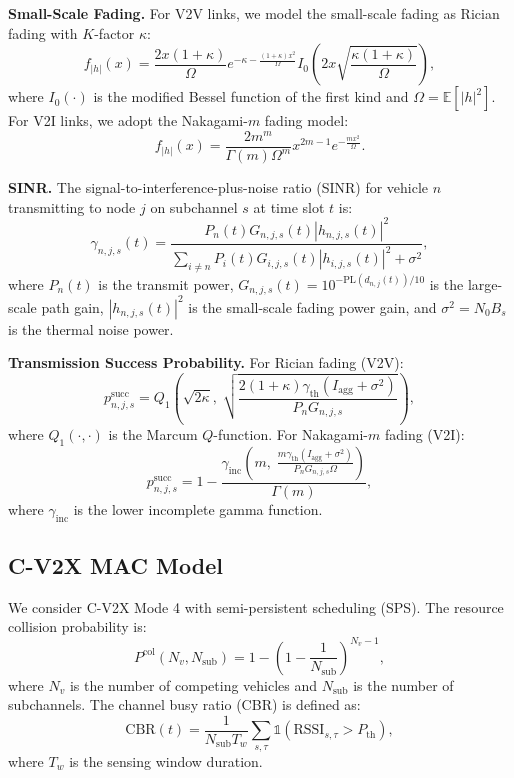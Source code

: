 \documentclass[journal]{IEEEtran}
\begin{document}
\textbf{Small-Scale Fading.} For V2V links, we model the small-scale fading as Rician fading with $K$-factor $\kappa$:
\begin{equation} \label{eq:rician}
f_{|h|}(x) = \frac{2x(1+\kappa)}{\Omega} e^{-\kappa - \frac{(1+\kappa)x^2}{\Omega}} I_0\left(2x\sqrt{\frac{\kappa(1+\kappa)}{\Omega}}\right),
\end{equation}
where $I_0(\cdot)$ is the modified Bessel function of the first kind and $\Omega = \mathbb{E}[|h|^2]$. For V2I links, we adopt the Nakagami-$m$ fading model:
\begin{equation} \label{eq:nakagami}
f_{|h|}(x) = \frac{2m^m}{\Gamma(m)\Omega^m} x^{2m-1} e^{-\frac{mx^2}{\Omega}}.
\end{equation}

\textbf{SINR.} The signal-to-interference-plus-noise ratio (SINR) for vehicle $n$ transmitting to node $j$ on subchannel $s$ at time slot $t$ is:
\begin{equation} \label{eq:sinr}
\gamma_{n,j,s}(t) = \frac{P_n(t) G_{n,j,s}(t) |h_{n,j,s}(t)|^2}{\sum_{i \neq n} P_i(t) G_{i,j,s}(t) |h_{i,j,s}(t)|^2 + \sigma^2},
\end{equation}
where $P_n(t)$ is the transmit power, $G_{n,j,s}(t) = 10^{-\text{PL}(d_{n,j}(t))/10}$ is the large-scale path gain, $|h_{n,j,s}(t)|^2$ is the small-scale fading power gain, and $\sigma^2 = N_0 B_s$ is the thermal noise power.

\textbf{Transmission Success Probability.} For Rician fading (V2V):
\begin{equation} \label{eq:tx_succ_rician}
p_{n,j,s}^{\text{succ}} = Q_1\left(\sqrt{2\kappa},\; \sqrt{\frac{2(1+\kappa)\gamma_{\text{th}}(I_{\text{agg}} + \sigma^2)}{P_n G_{n,j,s}}}\right),
\end{equation}
where $Q_1(\cdot,\cdot)$ is the Marcum $Q$-function. For Nakagami-$m$ fading (V2I):
\begin{equation} \label{eq:tx_succ_nakagami}
p_{n,j,s}^{\text{succ}} = 1 - \frac{\gamma_{\text{inc}}\left(m,\; \frac{m \gamma_{\text{th}}(I_{\text{agg}} + \sigma^2)}{P_n G_{n,j,s} \Omega}\right)}{\Gamma(m)},
\end{equation}
where $\gamma_{\text{inc}}$ is the lower incomplete gamma function.

\subsection{C-V2X MAC Model} \label{subsec:mac}

We consider C-V2X Mode 4 with semi-persistent scheduling (SPS). The resource collision probability is:
\begin{equation} \label{eq:collision}
P^{\text{col}}(N_v, N_{\text{sub}}) = 1 - \left(1 - \frac{1}{N_{\text{sub}}}\right)^{N_v - 1},
\end{equation}
where $N_v$ is the number of competing vehicles and $N_{\text{sub}}$ is the number of subchannels. The channel busy ratio (CBR) is defined as:
\begin{equation} \label{eq:cbr}
\text{CBR}(t) = \frac{1}{N_{\text{sub}} T_w} \sum_{s,\tau} \mathbb{1}(\text{RSSI}_{s,\tau} > P_{\text{th}}),
\end{equation}
where $T_w$ is the sensing window duration.
\end{document}
